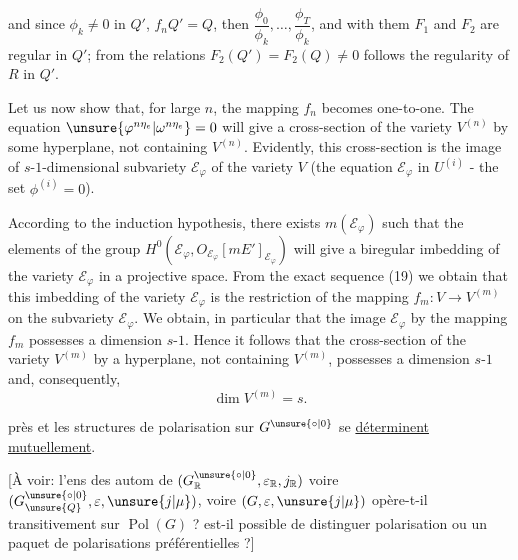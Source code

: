 and since $\phi_k\ne0$ in $Q'$, $f_nQ'=Q$, then $\dfrac{\phi_0}{\phi_k},\ldots,\dfrac{\phi_T}{\phi_k}$, and with them $F_1$ and $F_2$ are regular in $Q'$; from the relations $F_2(Q')=F_2(Q)\ne0$ follows the regularity of $R$ in $Q'$.

Let us now show that, for large $n$, the mapping $f_n$ becomes one-to-one. The equation $\unsure{\varphi^{n\eta_e}|\omega^{n\eta_e}}=0$ will give a cross-section of the variety $V^{(n)}$ by some hyperplane, not containing $V^{(n)}$. Evidently, this cross-section is the image of $s$-$1$-dimensional subvariety $\mathcal E_\varphi$ of the variety $V$ (the equation $\mathcal E_\varphi$ in $U^{(i)}$ - the set $\phi^{(i)}=0$).

According to the induction hypothesis, there exists $m(\mathcal E_\varphi)$ such that the elements of the group  $H^0(\mathcal E_\varphi,O_{\mathcal E_\varphi}[mE']_{\mathcal E_\varphi})$ will give a biregular imbedding of the variety $\mathcal E_\varphi$ in a projective space. From the exact sequence (19) we obtain that this imbedding of the variety $\mathcal E_\varphi$ is the restriction of the mapping $f_m:V\to V^{(m)}$ on the subvariety $\mathcal E_\varphi$. We obtain, in particular that the image $\mathcal E_\varphi$ by the mapping $f_m$ possesses a dimension $s$-$1$. Hence it follows that the cross-section of the variety $V^{(m)}$ by a hyperplane, not containing $V^{(m)}$, possesses a dimension $s$-$1$ and, consequently,
\[
\dim V^{(m)}=s.
\]

près et les structures de polarisation sur $G^{\unsure{\circ|0}}$ se \uline{déterminent mutuellement}.

 [À voir: l'ens des autom de $(G^{\unsure{\circ|0}}_{\mathbb R},\varepsilon_{\mathbb R},j_{\mathbb R})$ voire $(G^{\unsure{\circ|0}}_{\unsure{Q}},\varepsilon,\unsure{j|\mu})$, voire $(G,\varepsilon,\unsure{j|\mu})$ opère-t-il transitivement sur $\operatorname{Pol}(G)$ ?  est-il possible  de distinguer    polarisation ou un paquet de polarisations préférentielles ?]

